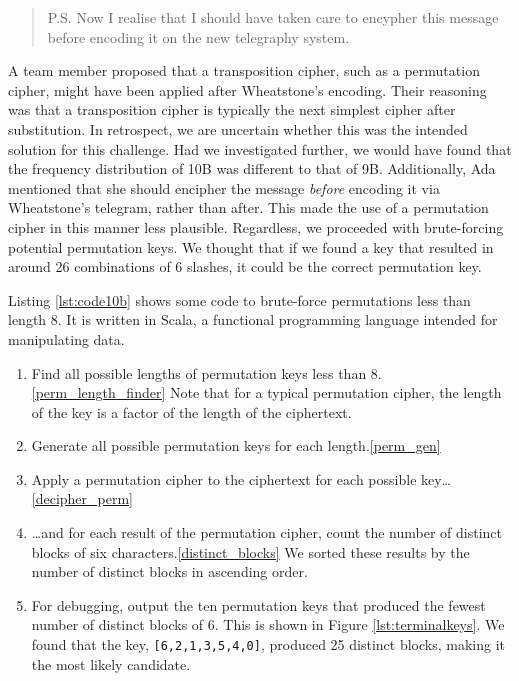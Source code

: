 \begin{quote}\ttfamily
    P.S. Now I realise that I should have taken care to encypher this message before 
    encoding it on the new telegraphy system.
\end{quote}

A team member proposed that a transposition cipher, such as a permutation cipher, might have been applied after Wheatstone's encoding. Their reasoning was that a transposition cipher is typically the next simplest cipher after substitution. In retrospect, we are uncertain whether this was the intended solution for this challenge. Had we investigated further, we would have found that the frequency distribution of 10B was different to that of 9B. Additionally, Ada mentioned that she should encipher the message \textit{before} encoding it via Wheatstone's telegram, rather than after. This made the use of a permutation cipher in this manner less plausible. Regardless, we proceeded with brute-forcing potential permutation keys. We thought that if we found a key that resulted in around 26 combinations of 6 slashes, it could be the correct permutation key.

Listing \ref{lst:code10b} shows some code to brute-force permutations less than length 8. It is written in Scala, a functional programming language intended for manipulating data. 

\begin{enumerate}
    \item Find all possible lengths of permutation keys less than 8.\cref{perm_length_finder} Note that for a typical permutation cipher, the length of the key is a factor of the length of the ciphertext.
    \item Generate all possible permutation keys for each length.\cref{perm_gen}
    \item Apply a permutation cipher to the ciphertext for each possible key\ldots\cref{decipher_perm}
    \item \ldots and for each result of the permutation cipher, count the number of distinct blocks of six characters.\cref{distinct_blocks} We sorted these results by the number of distinct blocks in ascending order.
    \item For debugging, output the ten permutation keys that produced the fewest number of distinct blocks of 6. This is shown in Figure \ref{lst:terminalkeys}. We found that the key, \texttt{[6,2,1,3,5,4,0]}, produced 25 distinct blocks, making it the most likely candidate.
\end{enumerate}

